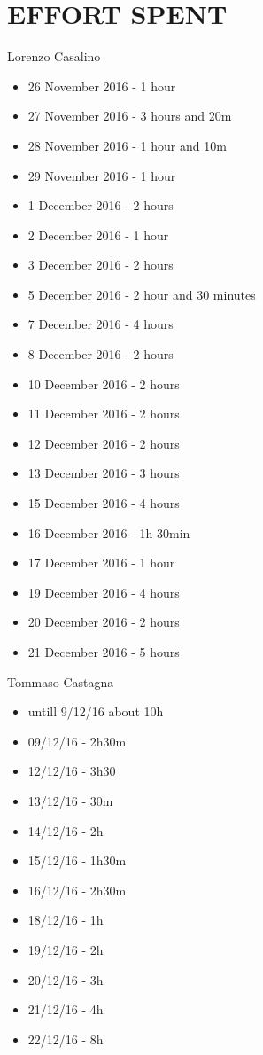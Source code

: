 \section{EFFORT SPENT}

	Lorenzo Casalino

	\begin{itemize}
		\item 26 November 2016 - 1 hour
		\item 27 November 2016 - 3 hours and 20m
		\item 28 November 2016 - 1 hour and 10m
		\item 29 November 2016 - 1 hour
		\item 1  December 2016 - 2 hours
		\item 2  December 2016 - 1 hour
		\item 3  December 2016 - 2 hours
		\item 5  December 2016 - 2 hour and 30 minutes
		\item 7  December 2016 - 4 hours
		\item 8  December 2016 - 2 hours
		\item 10 December 2016 - 2 hours
		\item 11 December 2016 - 2 hours
		\item 12 December 2016 - 2 hours
		\item 13 December 2016 - 3 hours
		\item 15 December 2016 - 4 hours
		\item 16 December 2016 - 1h 30min
		\item 17 December 2016 - 1 hour
		\item 19 December 2016 - 4 hours
		\item 20 December 2016 - 2 hours
		\item 21 December 2016 - 5 hours
	\end{itemize}

	Tommaso Castagna

	\begin{itemize}
		\item untill 9/12/16 about 10h
		\item 09/12/16 - 2h30m
		\item 12/12/16 - 3h30
		\item 13/12/16 - 30m
		\item 14/12/16 - 2h
		\item 15/12/16 - 1h30m
		\item 16/12/16 - 2h30m
		\item 18/12/16 - 1h
		\item 19/12/16 - 2h
		\item 20/12/16 - 3h
		\item 21/12/16 - 4h
		\item 22/12/16 - 8h
	\end{itemize}
